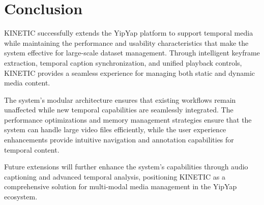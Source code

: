 \documentclass[10pt]{article}
\begin{document}
\section{Conclusion}

KINETIC successfully extends the YipYap platform to support temporal media while maintaining the performance and usability characteristics that make the system effective for large-scale dataset management. Through intelligent keyframe extraction, temporal caption synchronization, and unified playback controls, KINETIC provides a seamless experience for managing both static and dynamic media content.

The system's modular architecture ensures that existing workflows remain unaffected while new temporal capabilities are seamlessly integrated. The performance optimizations and memory management strategies ensure that the system can handle large video files efficiently, while the user experience enhancements provide intuitive navigation and annotation capabilities for temporal content.

Future extensions will further enhance the system's capabilities through audio captioning and advanced temporal analysis, positioning KINETIC as a comprehensive solution for multi-modal media management in the YipYap ecosystem.
\end{document}
